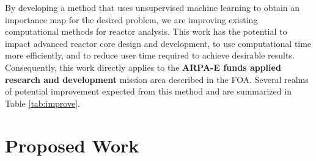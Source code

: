 \documentclass[letterpaper,12pt]{article}
\begin{document}
By developing a method that uses unsupervised machine learning to obtain an
importance map for the desired problem, we are improving existing computational
methods for reactor analysis. This work has the potential to
impact advanced reactor core design and development, to use computational time
more efficiently, and to reduce user time required to achieve desirable results.
Consequently, this work
directly applies to the \textbf{ARPA-E funds applied research and development}
mission area described in the FOA. Several realms of potential improvement 
expected from this method and are summarized in Table \ref{tab:improve}.



\section{Proposed Work}
\end{document}
